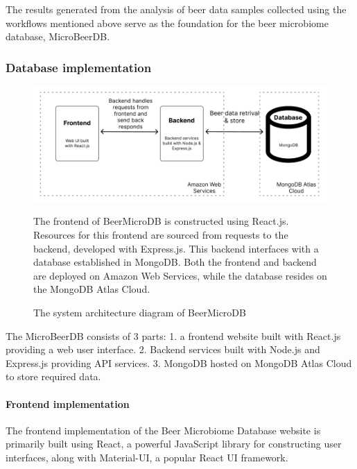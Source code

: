         The results generated from the analysis of beer data samples collected using the workflows mentioned above serve as the foundation for the beer microbiome database, MicroBeerDB.

        \subsubsection{Database implementation}

        
        \begin{figure}[H]
            \centering
            \includegraphics[scale=0.5]{images/system_architecture.png}
            \caption{The system architecture diagram of BeerMicroDB}
            \small The frontend of BeerMicroDB is constructed using React.js. Resources for this frontend are sourced from requests to the backend, developed with Express.js. This backend interfaces with a database established in MongoDB. Both the frontend and backend are deployed on Amazon Web Services, while the database resides on the MongoDB Atlas Cloud.
            \label{fig:methods:system_architecture}
        \end{figure}   

        The MicroBeerDB consists of 3 parts: 1. a frontend website built with React.js providing a web user interface. 2. Backend services built with Node.js and Express.js providing API services. 3. MongoDB hosted on MongoDB Atlas Cloud to store required data.

        \paragraph*{Frontend implementation}

            The frontend implementation of the Beer Microbiome Database website is primarily built using React, a powerful JavaScript library for constructing user interfaces, along with Material-UI, a popular React UI framework.

